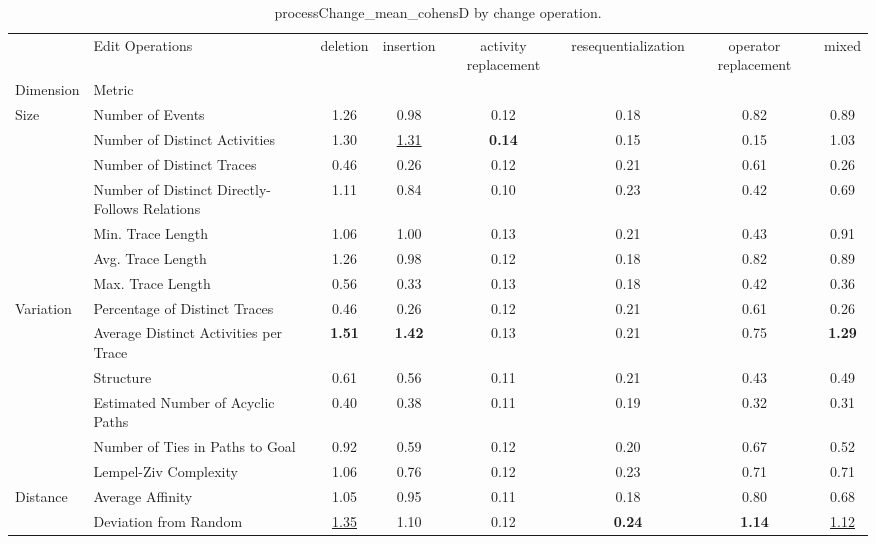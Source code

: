 \begin{table}[H]
\centering
\scriptsize
\caption{processChange_mean_cohensD by change operation.}
\label{tab:processchange-mean-cohensd-by-changeoperation}
\setlength{\tabcolsep}{2pt}  %
\begin{tabular}{llcccccc}
\toprule
              & Edit Operations &  deletion &  insertion &  activity replacement &  resequentialization &  operator replacement &  mixed \\
Dimension & Metric &           &            &                       &                      &                       &        \\
\midrule
Size & Number of Events & 1.26 & 0.98 & 0.12 & 0.18 & 0.82 & 0.89 \\
              & Number of Distinct Activities & 1.30 & \underline{1.31} & \textbf{0.14} & 0.15 & 0.15 & 1.03 \\
              & Number of Distinct Traces & 0.46 & 0.26 & 0.12 & 0.21 & 0.61 & 0.26 \\
              & Number of Distinct Directly-Follows Relations & 1.11 & 0.84 & 0.10 & 0.23 & 0.42 & 0.69 \\
              & Min. Trace Length & 1.06 & 1.00 & 0.13 & 0.21 & 0.43 & 0.91 \\
              & Avg. Trace Length & 1.26 & 0.98 & 0.12 & 0.18 & 0.82 & 0.89 \\
              & Max. Trace Length & 0.56 & 0.33 & 0.13 & 0.18 & 0.42 & 0.36 \\
Variation & Percentage of Distinct Traces & 0.46 & 0.26 & 0.12 & 0.21 & 0.61 & 0.26 \\
              & Average Distinct Activities per Trace & \textbf{1.51} & \textbf{1.42} & 0.13 & 0.21 & 0.75 & \textbf{1.29} \\
              & Structure & 0.61 & 0.56 & 0.11 & 0.21 & 0.43 & 0.49 \\
              & Estimated Number of Acyclic Paths & 0.40 & 0.38 & 0.11 & 0.19 & 0.32 & 0.31 \\
              & Number of Ties in Paths to Goal & 0.92 & 0.59 & 0.12 & 0.20 & 0.67 & 0.52 \\
              & Lempel-Ziv Complexity & 1.06 & 0.76 & 0.12 & 0.23 & 0.71 & 0.71 \\
Distance & Average Affinity & 1.05 & 0.95 & 0.11 & 0.18 & 0.80 & 0.68 \\
              & Deviation from Random & \underline{1.35} & 1.10 & 0.12 & \textbf{0.24} & \textbf{1.14} & \underline{1.12} \\

\end{tabular}
\end{table}
